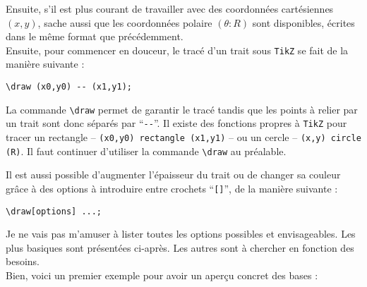 Ensuite, s'il est plus courant de travailler avec des coordonnées cartésiennes $(x,y)$, sache aussi que les coordonnées polaire $(\theta:R)$ sont disponibles, écrites dans le même format que précédemment. \\

Ensuite, pour commencer en douceur, le tracé d'un trait sous \texttt{TikZ} se fait de la manière suivante : \begin{center} \verb?\draw (x0,y0) -- (x1,y1);? \end{center} 

La commande \verb?\draw? permet de garantir le tracé tandis que les points à relier par un trait sont donc séparés par ``\verb?--?''. Il existe des fonctions propres à \texttt{TikZ} pour tracer un rectangle -- \verb?(x0,y0) rectangle (x1,y1)? -- ou un cercle -- \verb?(x,y) circle (R)?. Il faut continuer d'utiliser la commande \verb?\draw? au préalable.

Il est aussi possible d'augmenter l'épaisseur du trait ou de changer sa couleur grâce à des options à introduire entre crochets ``\verb?[]?'', de la manière suivante : \begin{center} \verb?\draw[options] ...;? \end{center}

Je ne vais pas m'amuser à lister toutes les options possibles et envisageables. Les plus basiques sont présentées ci-après. Les autres sont à chercher en fonction des besoins. \\

Bien, voici un premier exemple pour avoir un aperçu concret des bases :

